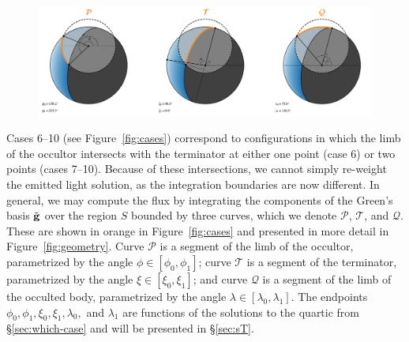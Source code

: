\documentclass[modern]{aastex62}
\begin{document}
\begin{figure}[t!]
    \begin{centering}
        \includegraphics[width=\linewidth]{figures/geometry.pdf}
    \end{centering}
\end{figure}

Cases 6--10 (see Figure~\ref{fig:cases}) correspond to configurations in which
the limb of the occultor intersects with the terminator at either one point
(case 6) or two points (cases 7--10). Because of these intersections, we
cannot simply re-weight the emitted light solution, as the integration
boundaries are now different. In general, we may compute the flux by
integrating the components of the Green's basis $\tilde{\mathbf{g}}$
over the region $S$ bounded by three curves, which we denote
$\mathcal{P}$, $\mathcal{T}$, and $\mathcal{Q}$. These are shown in orange
in Figure~\ref{fig:cases} and presented in more detail in
Figure~\ref{fig:geometry}.
Curve $\mathcal{P}$ is a segment of the limb of
the occultor, parametrized by the angle $\phi \in [\phi_0, \phi_1]$;
curve $\mathcal{T}$ is a segment of the terminator,
parametrized by the angle $\xi \in [\xi_0, \xi_1]$;
and curve $\mathcal{Q}$ is a segment of the limb of the occulted body,
parametrized by the angle $\lambda \in [\lambda_0, \lambda_1]$.
The endpoints $\phi_0, \phi_1, \xi_0, \xi_1, \lambda_0,$ and
$\lambda_1$ are functions of the solutions to the quartic from
\S\ref{sec:which-case} and will be presented in \S\ref{sec:sT}.
\end{document}
